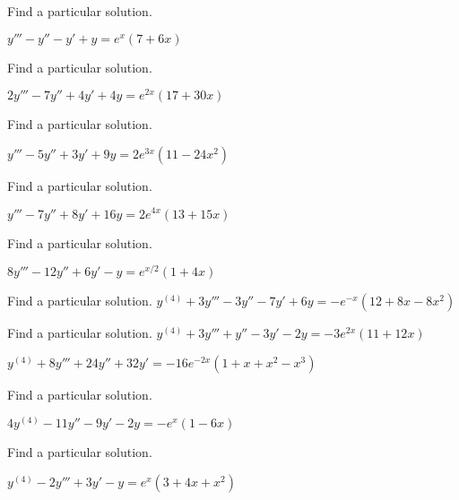 \documentclass{ximera}
\begin{document}
\begin{problem}\label{exer:9.3.8}   Find a particular solution.  

$y'''-y''-y'+y=e^x(7+6x)$
\end{problem}

\begin{problem}\label{exer:9.3.9}   Find a particular solution. 

$2y'''-7y''+4y'+4y=e^{2x}(17+30x)$
\end{problem}

\begin{problem}\label{exer:9.3.10}   Find a particular solution.

$y'''-5y''+3y'+9y=2e^{3x}(11-24x^2)$
\end{problem}

\begin{problem}\label{exer:9.3.11}   Find a particular solution.

$y'''-7y''+8y'+16y=2e^{4x}(13+15x)$
\end{problem}

\begin{problem}\label{exer:9.3.12}   Find a particular solution.

$8y'''-12y''+6y'-y=e^{x/2}(1+4x)$
\end{problem}

\begin{problem}\label{exer:9.3.13}   Find a particular solution.   $y^{(4)}+3y'''-3y''-7y'+6y=-e^{-x}(12+8x-8x^2)$
\end{problem}

\begin{problem}\label{exer:9.3.14}   Find a particular solution.   $y^{(4)}+3y'''+y''-3y'-2y=-3e^{2x}(11+12x)$
\end{problem}

\begin{problem}\label{exer:9.3.15}
$y^{(4)}+8y'''+24y''+32y'=-16e^{-2x}(1+x+x^2-x^3)$
\end{problem}

\begin{problem}\label{exer:9.3.16}   Find a particular solution.

$4y^{(4)}-11y''-9y'-2y=-e^x(1-6x)$
\end{problem}

\begin{problem}\label{exer:9.3.17}   Find a particular solution.

$y^{(4)}-2y'''+3y'-y=e^x(3+4x+x^2)$
\end{problem}
\end{document}
